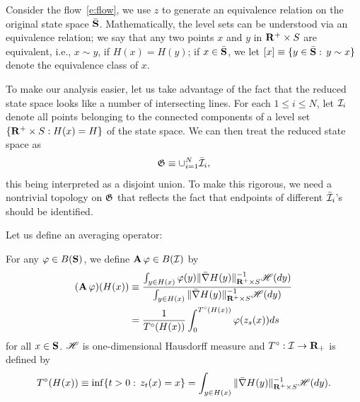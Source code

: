 Consider the flow~\eqref{e:flow}, we use $z$ to generate an equivalence relation on the original state space $\bar {\mathbf S}$. Mathematically, the level sets can be understood via an equivalence relation; we say that any two points $x$ and $y$ in $\mathbf R^+\times S$ are equivalent, i.e., $x \sim y$, if $H(x)=H(y)$; if $x\in \bar {\mathbf S}$, we let $[x]\equiv \{y\in \bar {\mathbf S}:\, y\sim x\}$ denote the equivalence class of $x$.

To make our analysis easier, let us take advantage of the fact that the reduced state space looks like a number of intersecting lines. For each $1\le i\le N$, let $\mathcal I_i$ denote all points belonging to the connected components of a level set $\{\mathbf R^+ \times S: H(x)=H\}$ of the state space. We can then treat the reduced state space  as
\[
\mathfrak G \equiv \cup_{i=1}^N \bar {\mathcal I}_i,
\]
this being interpreted as a disjoint union. To make this rigorous, we need a nontrivial topology on $\mathfrak G$ that reflects the fact that endpoints of different $\bar {\mathcal I}_i$'s should be identified.

Let us define an averaging operator:
\begin{definition}
For any $\varphi\in B(\mathbf S)$, we define $\operatorname{\mathbf A} \varphi\in B(\mathcal I)$ by
\begin{align*}
(\operatorname{\mathbf A} \varphi)(H(x)) &\equiv  \frac{\int_{y\in H(x)}\varphi(y)\|\bar \nabla
H(y)\|_{\mathbf R^+\times S}^{-1}\mathscr H(dy)}{\int_{y\in H(x)}\|\bar \nabla H(y)\|_{\mathbf R^+\times S}^{-1}\mathscr H(dy)}\\
&= \frac{1}{T^\circ(H(x))}\int_0^{T^\circ(H(x))}\varphi(z_s(x))ds
\end{align*}
for all $x\in \mathbf S$. $\mathscr H$ is one-dimensional Hausdorff measure and $T^\circ:\mathcal I \to \mathbf R_+$ is defined by
\[
T^\circ(H(x)) \equiv \inf\{t> 0:\, z_t(x)=x\} = \int_{y\in H(x)}\|\bar \nabla H(y)\|^{-1}_{\mathbf R^+\times S}\mathscr H(dy).
\]
\label{D:AVE}
\end{definition}

